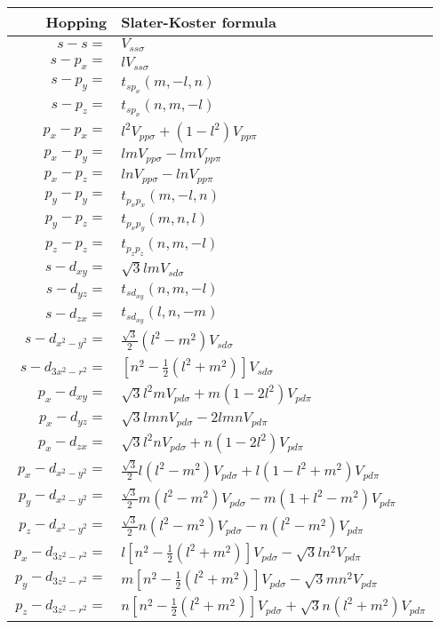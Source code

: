 \newpage
\begin{table}
\centering
\begin{tabular}{|r|l|}
 \hline
 Hopping & Slater-Koster formula \\ \hline
 $s-s=$ & $V_{ss\sigma}$ \\ \hline\hline
 $s-p_x=$ & $lV_{ss\sigma}$\\ \hline
 $s-p_y=$ & $t_{sp_x}(m,-l,n)$\\ \hline
 $s-p_z=$ & $t_{sp_x}(n,m,-l)$\\ \hline\hline
 
 $p_x-p_x=$ & $l^2 V_{pp\sigma} + \left(1-l^2\right) V_{pp\pi}$\\ \hline
 $p_x-p_y=$ & $lm V_{pp\sigma} - lm V_{pp\pi}$\\ \hline
 $p_x-p_z=$ & $ln V_{pp\sigma} - ln V_{pp\pi}$\\ \hline
 $p_y-p_y=$ & $t_{p_xp_x}(m,-l,n)$ \\ \hline
 $p_y-p_z=$ & $t_{p_xp_y}(m,n,l)$ \\ \hline
 $p_z-p_z=$ & $t_{p_zp_z}(n,m,-l)$ \\ \hline\hline
 
 $s-d_{xy}=$ & $\sqrt{3}lm V_{sd\sigma}$\\ \hline
 $s-d_{yz}=$ & $t_{sd_{xy}}(n,m,-l)$\\ \hline
 $s-d_{zx}=$ & $t_{sd_{xy}}(l,n,-m)$\\ \hline
 $s-d_{x^2-y^2}=$ & $\tfrac{\sqrt{3}}{2} (l^2-m^2) V_{sd\sigma}$\\ \hline
 $s-d_{3x^2-r^2}=$ & $ \left[n^2-\frac{1}{2}(l^2+m^2)\right] V_{sd\sigma}$\\ \hline\hline
 $p_x-d_{xy}=$ & $\sqrt{3}l^2m V_{pd\sigma} + m(1-2l^2) V_{pd\pi}$\\ \hline
 $p_x-d_{yz}=$ & $\sqrt{3}lmn V_{pd\sigma} - 2lmn V_{pd\pi}$\\ \hline
 $p_x-d_{zx}=$ & $\sqrt{3}l^2n V_{pd\sigma} + n(1-2l^2) V_{pd\pi}$\\ \hline
 $p_x-d_{x^2-y^2}=$ & $\frac{\sqrt{3}}{2}l(l^2-m^2) V_{pd\sigma} + l(1-l^2+m^2) V_{pd\pi}$\\ \hline
 $p_y-d_{x^2-y^2}=$ & $\tfrac{\sqrt{3}}{2}m(l^2-m^2) V_{pd\sigma} - m(1+l^2-m^2) V_{pd\pi}$\\ \hline
 $p_z-d_{x^2-y^2}=$ & $\tfrac{\sqrt{3}}{2}n(l^2-m^2) V_{pd\sigma} - n(l^2-m^2) V_{pd\pi}$\\ \hline
 $p_x-d_{3z^2-r^2}=$ & $l\left[n^2-\tfrac{1}{2}(l^2+m^2)\right] V_{pd\sigma}-\sqrt{3}ln^2 V_{pd\pi}$\\ \hline
 $p_y-d_{3z^2-r^2}=$ & $m\left[n^2-\tfrac{1}{2}(l^2+m^2)\right] V_{pd\sigma}-\sqrt{3}mn^2 V_{pd\pi}$\\ \hline
 $p_z-d_{3z^2-r^2}=$ & $n\left[n^2-\tfrac{1}{2}(l^2+m^2)\right] V_{pd\sigma}+ \sqrt{3}n(l^2+m^2) V_{pd\pi}$\\ \hline\hline
 

\end{tabular}
\end{table}
